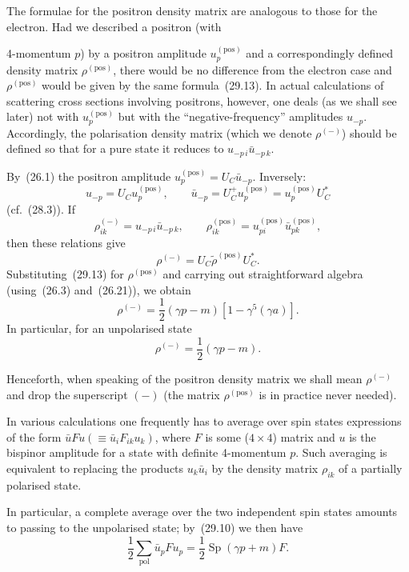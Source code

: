 The formulae for the positron density matrix are analogous to those for the electron. Had we described a positron (with

4-momentum $p$) by a positron amplitude $u_p^{(\text{pos})}$ and a correspondingly defined density matrix $\rho^{(\text{pos})}$, there would be no difference from the electron case and $\rho^{(\text{pos})}$ would be given by the same formula~(29.13). In actual calculations of scattering cross sections involving positrons, however, one deals (as we shall see later) not with $u_p^{(\text{pos})}$ but with the ``negative-frequency'' amplitudes $u_{-p}$. Accordingly, the polarisation density matrix (which we denote $\rho^{(-)}$) should be defined so that for a pure state it reduces to $u_{-p\,i}\bar u_{-p\,k}$.

By~(26.1) the positron amplitude $u_p^{(\text{pos})} = U_C\bar u_{-p}$. Inversely:
\[
u_{-p} = U_C u_p^{(\text{pos})},\qquad \bar u_{-p} = U_C^+ u_p^{(\text{pos})} = u_p^{(\text{pos})}U_C^*
\]
(cf.~(28.3)). If
\[
\rho^{(-)}_{ik} = u_{-p\,i}\bar u_{-p\,k},\qquad \rho^{(\text{pos})}_{ik} = u^{(\text{pos})}_{pi}\bar u^{(\text{pos})}_{pk},
\]
then these relations give
\begin{equation}
\rho^{(-)} = U_C\widetilde\rho^{(\text{pos})}U_C^*.
\tag{29.15}
\end{equation}
Substituting~(29.13) for $\rho^{(\text{pos})}$ and carrying out straightforward algebra (using~(26.3) and~(26.21)), we obtain
\begin{equation}
\rho^{(-)} = \frac{1}{2}(\gamma p - m)[1 - \gamma^5(\gamma a)].
\tag{29.16}
\end{equation}
In particular, for an unpolarised state
\begin{equation}
\rho^{(-)} = \frac{1}{2}(\gamma p - m).
\tag{29.17}
\end{equation}

Henceforth, when speaking of the positron density matrix we shall mean $\rho^{(-)}$ and drop the superscript $(-)$ (the matrix $\rho^{(\text{pos})}$ is in practice never needed).

In various calculations one frequently has to average over spin states expressions of the form $\bar u Fu(\equiv \bar u_i F_{ik} u_k)$, where $F$ is some ($4 \times 4$) matrix and $u$ is the bispinor amplitude for a state with definite 4-momentum $p$. Such averaging is equivalent to replacing the products $u_k\bar u_i$ by the density matrix $\rho_{ik}$ of a partially polarised state.

In particular, a complete average over the two independent spin states amounts to passing to the unpolarised state; by~(29.10) we then have
\begin{equation}
\frac{1}{2}\sum_{\text{pol}}\bar u_p Fu_p = \frac{1}{2}\operatorname{Sp}(\gamma p + m)F.
\tag{29.18}
\end{equation}

